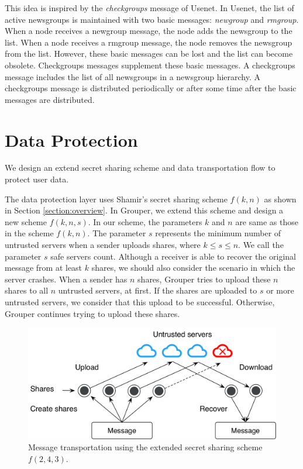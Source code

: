 \documentclass[a4paper,11pt]{report}
\begin{document}
This idea is inspired by the \emph{checkgroups} message of Usenet\cite{usenet}.
In Usenet, the list of active newsgroups is maintained with two basic messages: \emph{newgroup} and \emph{rmgroup}.
When a node receives a newgroup message, the node adds the newsgroup to the list.
When a node receives a rmgroup message, the node removes the newsgroup from the list.
However, these basic messages can be lost and the list can become obsolete.
Checkgroups messages supplement these basic messages.
A checkgroups message includes the list of all newsgroups in a newsgroup hierarchy.
A checkgroups message is distributed periodically or after some time after the basic messages are distributed.

\section{Data Protection}  \label{section:data_protection}

We design an extend secret sharing scheme and data transportation flow to protect user data.

The data protection layer uses Shamir's secret sharing scheme $f(k, n)$ as shown in Section \ref{section:overview}.
In Grouper, we extend this scheme and design a new scheme $ f(k, n, s)$.
In our scheme, the parameters $k$ and $n$ are same as those in the scheme $f(k, n)$. 
The parameter $s$ represents the minimum number of untrusted servers when a sender uploads shares, where $k \leq s \leq n$.
We call the parameter $s$ safe servers count.
Although a receiver is able to recover the original message from at least $k$ shares, we should also consider the scenario in which the server crashes. 
When a sender has $n$ shares, Grouper tries to upload these $n$ shares to all $n$ untrusted servers, at first. 
If the shares are uploaded to $s$ or more untrusted servers, we consider that this upload to be successful.
Otherwise, Grouper continues trying to upload these shares.

\begin{figure}[t]
	\centering
	\includegraphics[scale=0.65]{transportation}
	\caption{Message transportation using the extended secret sharing scheme $f(2, 4, 3)$.}
	\label{fig:transportation}
\end{figure}
\end{document}
